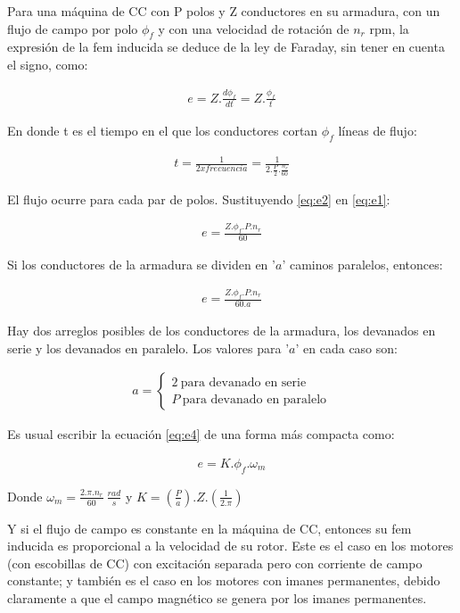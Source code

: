 \documentclass{article}
\begin{document}
\begin{sloppypar}
Para una máquina de CC con P polos y Z conductores en su armadura, con un flujo de campo por polo $\phi_f$ y con una velocidad de rotación de $n_r$ rpm, la expresión de la fem inducida se deduce de la ley de Faraday, sin tener en cuenta el signo, como:

\begin{align}   \label{eq:e1}
    e=Z.\frac{d\phi_f}{dt}=Z.\frac{\phi_f}{t}
\end{align}

En donde t es el tiempo en el que los conductores cortan $\phi_f$ líneas de flujo:

\begin{align}   \label{eq:e2}
    t=\frac{1}{2xfrecuencia}=\frac{1}{2.\frac{P}{2}.\frac{n_r}{60}}
\end{align}

El flujo ocurre para cada par de polos. Sustituyendo \ref{eq:e2} en \ref{eq:e1}:

\begin{align}   \label{eq:e3}
    e=\frac{Z.\phi_f.P.n_r}{60}
\end{align}

Si los conductores de la armadura se dividen en '$a$' caminos paralelos, entonces:

\begin{align}   \label{eq:e4}
    e=\frac{Z.\phi_f.P.n_r}{60.a}
\end{align}

Hay dos arreglos posibles de los conductores de la armadura, los devanados en serie y los devanados en paralelo. Los valores para '$a$' en cada caso son:

\begin{align} \label{eq:e5}
    a=
    \begin{cases}
        2\ \text{para devanado en serie}
        \\
        P\ \text{para devanado en paralelo}
    \end{cases}
\end{align}

Es usual escribir la ecuación \ref{eq:e4} de una forma más compacta como:

\begin{align}   \label{eq:e6}
    e=K.\phi_f.\omega_m
\end{align}

Donde $\omega_m=\frac{2.\pi.n_r}{60}\ \frac{rad}{s}$ y $K=(\frac{P}{a}).Z.(\frac{1}{2.\pi})$

\hfill


Y si el flujo de campo es constante en la máquina de CC, entonces su fem inducida es proporcional a la velocidad de su rotor.
Este es el caso en los motores (con escobillas de CC) con excitación separada pero con corriente de campo constante; y también es el caso en los motores con imanes permanentes, debido claramente a que el campo magnético se genera por los imanes permanentes.


\end{sloppypar}
\end{document}
